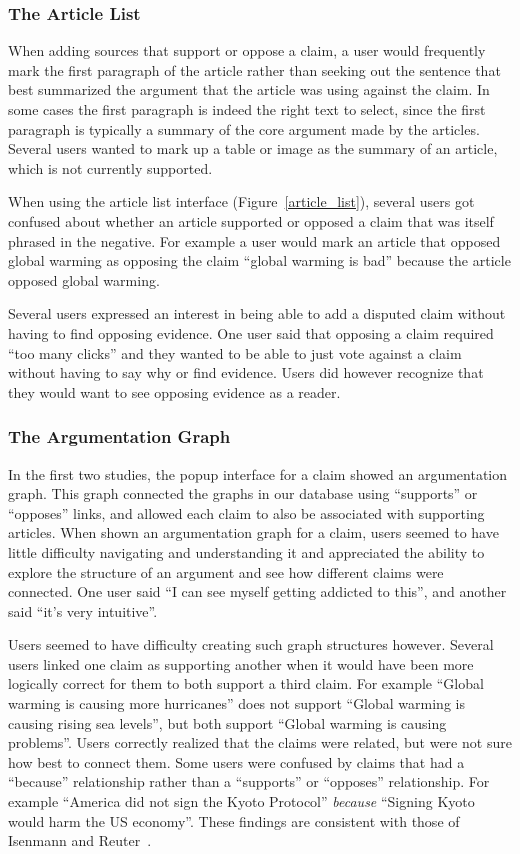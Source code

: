 \documentclass{www2010-submission}
\begin{document}
\subsubsection{The Article List}

When adding sources that support or oppose a claim, a user would frequently mark the first paragraph of the article rather than seeking out the sentence that best summarized the argument that the article was using against the claim. In some cases the first paragraph is indeed the right text to select, since the first paragraph is typically a summary of the core argument made by the articles. Several users wanted to mark up a table or image as the summary of an article, which is not currently supported.

When using the article list interface (Figure~\ref{article_list}), several users got confused about whether an article supported or opposed a claim that was itself phrased in the negative. For example a user would mark an article that opposed global warming as opposing the claim ``global warming is bad'' because the article opposed global warming.

Several users expressed an interest in being able to add a disputed claim without having to find opposing evidence. One user said that opposing a claim required ``too many clicks'' and they wanted to be able to just vote against a claim without having to say why or find evidence. Users did however recognize that they would want to see opposing evidence as a reader.

\subsubsection{The Argumentation Graph}

In the first two studies, the popup interface for a claim showed an argumentation graph. This graph connected the graphs in our database using ``supports'' or ``opposes'' links, and allowed each claim to also be associated with supporting articles. When shown an argumentation graph for a claim, users seemed to have little difficulty navigating and understanding it and appreciated the ability to explore the structure of an argument and see how different claims were connected. One user said ``I can see myself getting addicted to this'', and another said ``it's very intuitive''.

Users seemed to have difficulty creating such graph structures however. Several users linked one claim as supporting another when it would have been more logically correct for them to both support a third claim. For example ``Global warming is causing more hurricanes'' does not support ``Global warming is causing rising sea levels'', but both support ``Global warming is causing problems''. Users correctly realized that the claims were related, but were not sure how best to connect them. Some users were confused by claims that had a ``because'' relationship rather than a ``supports'' or ``opposes'' relationship. For example ``America did not sign the Kyoto Protocol'' {\it because} ``Signing Kyoto would harm the US economy''. These findings are consistent with those of Isenmann and Reuter~\cite{Isenmann1997}.
\end{document}
